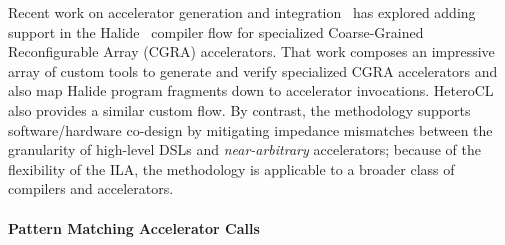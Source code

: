 Recent work on accelerator generation and integration~\cite{
    bahr2020creating, truong2020fault}
  has explored adding support in the Halide~\cite{ragan2013halide}
  compiler flow for specialized Coarse-Grained Reconfigurable Array (CGRA) accelerators.
That work composes an
  impressive array of custom tools to
  generate and verify specialized CGRA accelerators
  and also map Halide program fragments
  down to accelerator invocations.
HeteroCL~\cite{lai2019heterocl} also provides
  a similar custom flow.
By contrast, the \TLA methodology supports %
  software/hardware co-design by mitigating impedance mismatches
  between the granularity of high-level %
  DSLs and \textit{near-arbitrary} accelerators;
  because of the flexibility of the ILA,
  the \TLA methodology is applicable to a
  broader class of compilers and accelerators.

\paragraph{Pattern Matching Accelerator Calls}



